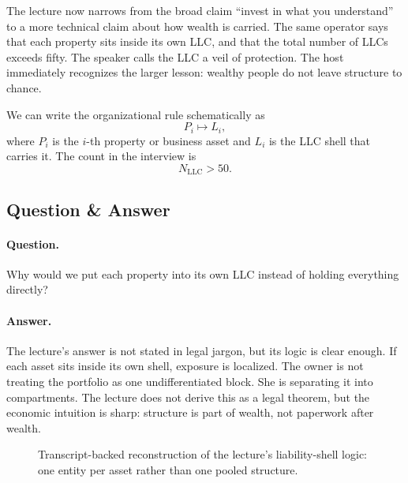 The lecture now narrows from the broad claim ``invest in what you understand'' to a more technical claim about how wealth is carried. The same operator says that each property sits inside its own LLC, and that the total number of LLCs exceeds fifty. The speaker calls the LLC a veil of protection. The host immediately recognizes the larger lesson: wealthy people do not leave structure to chance.

We can write the organizational rule schematically as
\begin{equation}
P_i \mapsto L_i,
\end{equation}
where \(P_i\) is the \(i\)-th property or business asset and \(L_i\) is the LLC shell that carries it. The count in the interview is
\begin{equation}
N_{\mathrm{LLC}} > 50.
\end{equation}

\subsection{Question \& Answer}

\paragraph{Question.} Why would we put each property into its own LLC instead of holding everything directly?

\paragraph{Answer.} The lecture's answer is not stated in legal jargon, but its logic is clear enough. If each asset sits inside its own shell, exposure is localized. The owner is not treating the portfolio as one undifferentiated block. She is separating it into compartments. The lecture does not derive this as a legal theorem, but the economic intuition is sharp: structure is part of wealth, not paperwork after wealth.

\begin{figure}[h]
\centering
{}
\caption{Transcript-backed reconstruction of the lecture's liability-shell logic: one entity per asset rather than one pooled structure.}
\end{figure}

